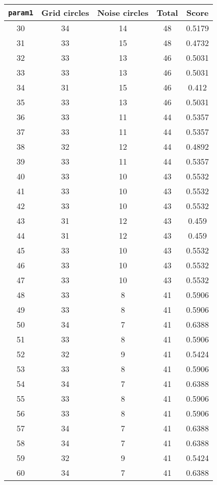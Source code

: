 \documentclass[letterpaper, 12pt]{article}
\begin{document}
\begin{longtable}{|c|c|c|c|c|}
\hline
\textbf{\texttt{param1}} & \textbf{Grid circles} & \textbf{Noise circles} & \textbf{Total} & \textbf{Score} \\
\hline
30 & 34 & 14 & 48 & 0.5179 \\
\hline
31 & 33 & 15 & 48 & 0.4732 \\
\hline
32 & 33 & 13 & 46 & 0.5031 \\
\hline
33 & 33 & 13 & 46 & 0.5031 \\
\hline
34 & 31 & 15 & 46 & 0.412 \\
\hline
35 & 33 & 13 & 46 & 0.5031 \\
\hline
36 & 33 & 11 & 44 & 0.5357 \\
\hline
37 & 33 & 11 & 44 & 0.5357 \\
\hline
38 & 32 & 12 & 44 & 0.4892 \\
\hline
39 & 33 & 11 & 44 & 0.5357 \\
\hline
40 & 33 & 10 & 43 & 0.5532 \\
\hline
41 & 33 & 10 & 43 & 0.5532 \\
\hline
42 & 33 & 10 & 43 & 0.5532 \\
\hline
43 & 31 & 12 & 43 & 0.459 \\
\hline
44 & 31 & 12 & 43 & 0.459 \\
\hline
45 & 33 & 10 & 43 & 0.5532 \\
\hline
46 & 33 & 10 & 43 & 0.5532 \\
\hline
47 & 33 & 10 & 43 & 0.5532 \\
\hline
48 & 33 & 8 & 41 & 0.5906 \\
\hline
49 & 33 & 8 & 41 & 0.5906 \\
\hline
50 & 34 & 7 & 41 & 0.6388 \\
\hline
51 & 33 & 8 & 41 & 0.5906 \\
\hline
52 & 32 & 9 & 41 & 0.5424 \\
\hline
53 & 33 & 8 & 41 & 0.5906 \\
\hline
54 & 34 & 7 & 41 & 0.6388 \\
\hline
55 & 33 & 8 & 41 & 0.5906 \\
\hline
56 & 33 & 8 & 41 & 0.5906 \\
\hline
57 & 34 & 7 & 41 & 0.6388 \\
\hline
58 & 34 & 7 & 41 & 0.6388 \\
\hline
59 & 32 & 9 & 41 & 0.5424 \\
\hline
60 & 34 & 7 & 41 & 0.6388 \\

\end{longtable}
\end{document}
